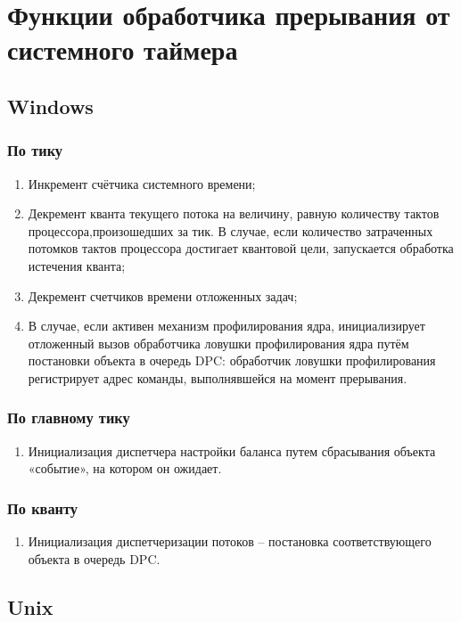 \chapter{Функции обработчика прерывания от системного таймера}

\section{Windows}

\subsection{По тику}
\begin{enumerate}
	\item Инкремент счётчика системного времени;
	\item Декремент кванта текущего потока на величину, равную количеству тактов процессора,произошедших за тик. В случае, если количество затраченных потомков тактов процессора достигает квантовой цели, запускается обработка истечения кванта;
	\item Декремент счетчиков времени отложенных задач;
	\item В случае, если активен механизм профилирования ядра, инициализирует отложенный вызов обработчика ловушки профилирования ядра путём постановки объекта в очередь DPC: обработчик ловушки профилирования регистрирует адрес команды, выполнявшейся на момент прерывания.
\end{enumerate}

\subsection{По главному тику}
\begin{enumerate}
	\item Инициализация диспетчера настройки баланса путем сбрасывания объекта «событие», на котором он ожидает.
\end{enumerate}

\subsection{По кванту}
\begin{enumerate}
	\item Инициализация диспетчеризации потоков – постановка соответствующего объекта в очередь DPC.
\end{enumerate}

\section{Unix}

